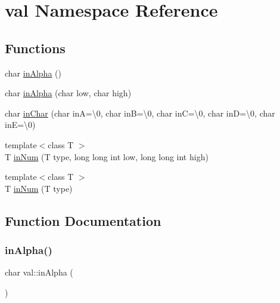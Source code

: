 \hypertarget{namespaceval}{}\section{val Namespace Reference}
\label{namespaceval}
\subsection*{Functions}
\begin{DoxyCompactItemize}
\item 
char \hyperlink{namespaceval_acad8baaceeaf8769a366f4363904ccbf}{in\+Alpha} ()
\item 
char \hyperlink{namespaceval_a9d9b8061acd12340109a2c0f9ff8cbde}{in\+Alpha} (char low, char high)
\item 
char \hyperlink{namespaceval_a42fc673916a9deeccf41604909858a8d}{in\+Char} (char inA=\textquotesingle{}\textbackslash{}0\textquotesingle{}, char inB=\textquotesingle{}\textbackslash{}0\textquotesingle{}, char inC=\textquotesingle{}\textbackslash{}0\textquotesingle{}, char inD=\textquotesingle{}\textbackslash{}0\textquotesingle{}, char inE=\textquotesingle{}\textbackslash{}0\textquotesingle{})
\item 
{\footnotesize template$<$class T $>$ }\\T \hyperlink{namespaceval_a258bd30a8b60ae8e2c0105e1abdc9403}{in\+Num} (T type, long long int low, long long int high)
\item 
{\footnotesize template$<$class T $>$ }\\T \hyperlink{namespaceval_a60111e656b9a6cf50799589c32b7cf55}{in\+Num} (T type)
\end{DoxyCompactItemize}


\subsection{Function Documentation}
\mbox{\label{namespaceval_acad8baaceeaf8769a366f4363904ccbf}} 
\subsubsection{\texorpdfstring{in\+Alpha()}{inAlpha()}\hspace{0.1cm}{\footnotesize\ttfamily [1/2]}}
{\footnotesize\ttfamily char val\+::in\+Alpha (\begin{DoxyParamCaption}{ }\end{DoxyParamCaption})}



